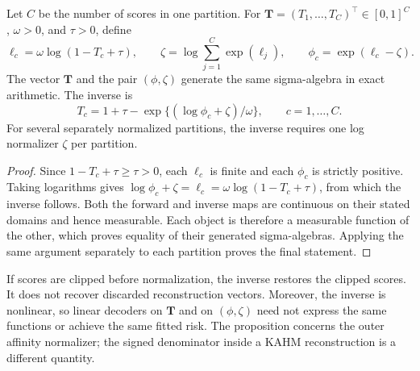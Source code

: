 \begin{proposition}
\label{c:prop:normalizer-inverse}
Let $C$ be the number of scores in one partition. For
$\mathbf T=(T_1,\ldots,T_C)^\top\in[0,1]^C$, $\omega>0$, and $\tau>0$,
define
\[
 \ell_c=\omega\log(1-T_c+\tau),\qquad
 \zeta=\log\sum_{j=1}^{C}\exp(\ell_j),\qquad
 \phi_c=\exp(\ell_c-\zeta).
\]
The vector $\mathbf T$ and the pair $(\phi,\zeta)$ generate the same
sigma-algebra in exact arithmetic. The inverse is
\[
 T_c=1+\tau-\exp\{(\log\phi_c+\zeta)/\omega\},
 \qquad c=1,\ldots,C.
\]
For several separately normalized partitions, the inverse requires one
log normalizer $\zeta$ per partition.
\end{proposition}
\begin{proof}
Since $1-T_c+\tau\geq\tau>0$, each $\ell_c$ is finite and each
$\phi_c$ is strictly positive. Taking logarithms gives
$\log\phi_c+\zeta=\ell_c=\omega\log(1-T_c+\tau)$, from which the
inverse follows. Both the forward and inverse maps are continuous on
their stated domains and hence measurable. Each object is therefore a
measurable function of the other, which proves equality of their
generated sigma-algebras. Applying the same argument separately to each
partition proves the final statement.
\end{proof}

If scores are clipped before normalization, the inverse restores the
clipped scores. It does not recover discarded reconstruction vectors.
Moreover, the inverse is nonlinear, so linear decoders on $\mathbf T$
and on $(\phi,\zeta)$ need not express the same functions or achieve
the same fitted risk. The proposition concerns the outer affinity
normalizer; the signed denominator inside a KAHM reconstruction is a
different quantity.

